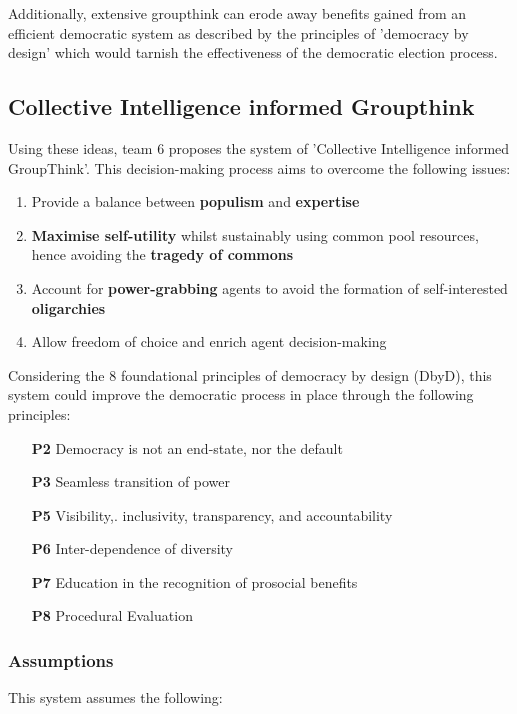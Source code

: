 Additionally, extensive groupthink can erode away benefits gained from an efficient democratic system as described by the principles of 'democracy by design' which would tarnish the effectiveness of the democratic election process.

\subsection{Collective Intelligence informed Groupthink}

Using these ideas, team 6 proposes the system of 'Collective Intelligence informed GroupThink'.  This decision-making process aims to overcome the following issues:

\begin{enumerate}
  \item Provide a balance between \textbf{populism} and \textbf{expertise}
  \item\textbf{Maximise self-utility} whilst sustainably using common pool resources, hence avoiding the \textbf{tragedy of commons}
  \item Account for \textbf{power-grabbing} agents to avoid the formation of self-interested \textbf{oligarchies}
  \item Allow freedom of choice and enrich agent decision-making
\end{enumerate}

Considering the 8 foundational principles of democracy by design (DbyD), this system could improve the democratic process in place through the following principles: \cite{Jpitt}
    \begin{enumerate}
        \item[\textbf{P2}] Democracy is not an end-state, nor the default
        \item[\textbf{P3}]Seamless transition of power
        \item[\textbf{P5}] Visibility,. inclusivity, transparency, and accountability
        \item[\textbf{P6}] Inter-dependence of diversity 
        \item[\textbf{P7}] Education in the recognition of prosocial benefits
        \item[\textbf{P8}] Procedural Evaluation
    \end{enumerate}
\subsubsection{Assumptions}
This system assumes the following:

